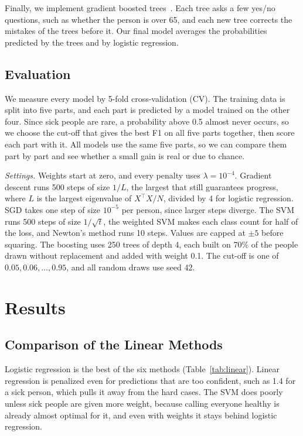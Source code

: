 \documentclass[10pt,conference,compsocconf]{IEEEtran}
\begin{document}
Finally, we implement gradient boosted trees~\cite{xgboost}. Each tree asks a few yes/no
questions, such as whether the person is over 65, and each new tree corrects
the mistakes of the trees before it. Our final model averages the
probabilities predicted by the trees and by logistic regression.

\subsection{Evaluation}

We measure every model by 5-fold cross-validation (CV). The training data is
split into five parts, and each part is predicted by a model trained on the
other four. Since sick people are rare, a probability above 0.5 almost never
occurs, so we choose the cut-off that gives the best F1 on all five parts
together, then score each part with it. All models use the same five parts, so we can compare them part by part and
see whether a small gain is real or due to chance.

\emph{Settings.} Weights start at zero, and every penalty uses
$\lambda = 10^{-4}$. Gradient descent runs 500 steps of size $1/L$, the
largest that still guarantees progress, where $L$ is the largest eigenvalue
of $X^\top X/N$, divided by 4 for logistic regression. SGD takes one step of
size $10^{-5}$ per person, since larger steps diverge. The SVM runs
500 steps of size $1/\sqrt{t}$, the weighted SVM makes each class count for
half of the loss, and Newton's method runs 10 steps. Values are capped at
$\pm 5$ before squaring. The boosting uses 250 trees of depth 4, each built
on 70\% of the people drawn without replacement and added with weight 0.1.
The cut-off is one of $0.05, 0.06, \dots, 0.95$, and all random draws use
seed 42.

\section{Results}

\subsection{Comparison of the Linear Methods}

Logistic regression is the best of the six methods (Table~\ref{tab:linear}).
Linear regression is penalized even for predictions that are too confident,
such as 1.4 for a sick person, which pulls it away from the hard cases.
The SVM does poorly unless sick people are given more weight, because calling everyone healthy is already almost optimal for it, and even
with weights it stays behind logistic regression.
\end{document}
